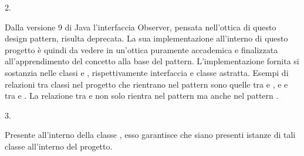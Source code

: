\documentclass[letterpaper,10pt,italian,openany,oneside]{sphinxmanual}
\begin{document}
2.  %
\begin{footnote}[3]\sphinxAtStartFootnote
{}
%
\end{footnote}
Dalla versione 9 di Java l’interfaccia Observer, pensata nell’ottica di questo design pattern, risulta deprecata.
La sua implementazione all’interno di questo progetto è quindi da vedere in un’ottica puramente accademica e finalizzata all’apprendimento del concetto alla base del pattern.
L’implementazione fornita si sostanzia nelle classi  e , rispettivamente interfaccia e classe astratta.
Esempi di relazioni tra classi nel progetto che rientrano nel pattern  sono quelle tra   e ,  e  
e tra   e  .
La relazione tra  e  non solo rientra nel pattern  ma anche nel pattern .

3.  %
\begin{footnote}[4]\sphinxAtStartFootnote
{}
%
\end{footnote}
Presente all’interno della classe , esso garantisce che siano presenti  istanze di tali classe all’interno del progetto.
\end{document}
